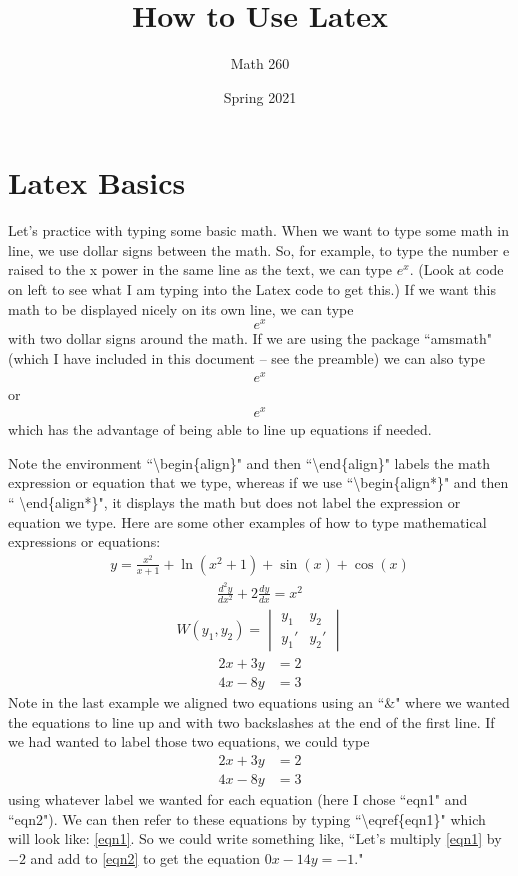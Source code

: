 \documentclass{article}
\title{How to Use Latex}
\author{Math 260}
\date{Spring 2021}
\begin{document}
\maketitle

\section{Latex Basics}
Let's practice with typing some basic math. When we want to type some math in line, we use dollar signs between the math. So, for example, to type the number e raised to the x power in the same line as the text, we can type $e^x$. (Look at code on left to see what I am typing into the Latex code to get this.) If we want this math to be displayed nicely on its own line, we can type $$e^x$$ with two dollar signs around the math. If we are using the package ``amsmath" (which I have included in this document -- see the preamble) we can also type
\begin{align}
    e^x
\end{align}
or
\begin{align*}
    e^x
\end{align*}
which has the advantage of being able to line up equations if needed.

Note the environment ``\textbackslash begin\{align\}" and then ``\textbackslash end\{align\}" labels the math expression or equation that we type, whereas if we use ``\textbackslash begin\{align*\}" and then `` \textbackslash end\{align*\}", it displays the math but does not label the expression or equation we type. Here are some other examples of how to type mathematical expressions or equations:
\begin{align*}
    y = \frac{x^2}{x+1} + \ln(x^2+1) + \sin(x) + \cos(x)
\end{align*}
\begin{align*}
    \frac{d^2 y}{dx^2} + 2 \frac{dy}{dx} = x^2
\end{align*}
\begin{align*}
    W(y_1, y_2) = \begin{vmatrix}
    y_1 & y_2 \\
    y_1' & y_2'
    \end{vmatrix}
\end{align*}
\begin{align*}
    2x + 3y &= 2 \\
    4x - 8y &= 3
\end{align*}
Note in the last example we aligned two equations using an ``\&" where we wanted the equations to line up and with two backslashes at the end of the first line. If we had wanted to label those two equations, we could type
\begin{align}
    2x + 3y &= 2 \label{eqn1} \\
    4x - 8y &= 3 \label{eqn2}
\end{align}
using whatever label we wanted for each equation (here I chose ``eqn1" and ``eqn2"). We can then refer to these equations by typing ``\textbackslash eqref\{eqn1\}" which will look like: \eqref{eqn1}. So we could write something like, ``Let's multiply \eqref{eqn1} by $-2$ and add to \eqref{eqn2} to get the equation $0x -14y = -1$."
\end{document}
